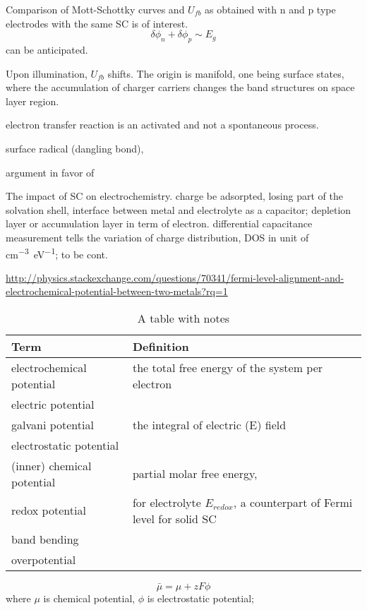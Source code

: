 Comparison of Mott-Schottky curves and $U_{fb}$ as obtained with n and p type electrodes with the same SC is of interest. 
\[
\delta\phi_{n} + \delta\phi_{p} \sim E_g
\]
can be anticipated. 

Upon illumination, $U_{fb}$ shifts. The origin is manifold, one being surface states, where the accumulation of charger carriers changes the band structures on space layer region. 

electron transfer reaction is an activated and not a spontaneous process. 

surface radical (dangling bond), 
 
argument in favor of 


The impact of SC on electrochemistry.\cite{Gerischer1990} charge be adsorpted, losing part of the solvation shell, interface between metal and electrolyte as a capacitor; depletion layer or accumulation layer in term of electron. differential capacitance measurement tells the variation of charge distribution, DOS in unit of \si{cm^{-3}eV^{-1}}; to be cont.



\url{http://physics.stackexchange.com/questions/70341/fermi-level-alignment-and-electrochemical-potential-between-two-metals?rq=1}

\begin{table}
  \centering
  \caption{A table with notes}  \label{tbl:notes}
  \begin{tabular}{lp{4in}}
    \toprule
    Term      & Definition \\
    \midrule
    electrochemical potential      & the total free energy of the system per electron \\
    electric potential             &  \\
    galvani potential              & the integral of electric (E) field\\
    electrostatic potential        &  \\
    (inner) chemical potential     & partial molar free energy, \\
    redox potential                & for electrolyte $E_{redox}$, a counterpart of Fermi level for solid SC\\
    band bending                   & \\
    overpotential                & \\
    \bottomrule
  \end{tabular}
\end{table}

\[
\bar{\mu} = \mu + zF\phi
\]
where $\mu$ is chemical potential, $\phi$ is electrostatic potential; 

